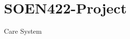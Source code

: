 \chapter{SOEN422-\/\+Project }
\hypertarget{md__r_e_a_d_m_e}{}\label{md__r_e_a_d_m_e}
\label{md__r_e_a_d_m_e_autotoc_md0}%
%


 Care System 